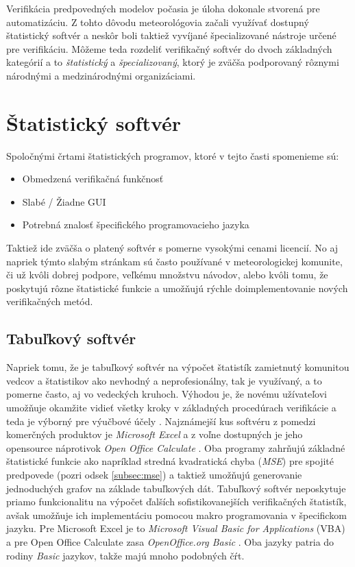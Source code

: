 
Verifikácia predpovedných modelov počasia je úloha dokonale stvorená pre automatizáciu. 
Z tohto dôvodu meteorológovia začali využívať dostupný štatistický softvér 
a neskôr boli taktiež vyvíjané špecializované nástroje určené pre verifikáciu.
Môžeme teda rozdeliť verifikačný softvér do dvoch základných kategórií a to \textit{štatistický} a \textit{špecializovaný}, ktorý je zväčša podporovaný rôznymi národnými a medzinárodnými organizáciami.

\section{Štatistický softvér}

Spoločnými črtami štatistických programov, ktoré v tejto časti spomenieme sú: 
\begin{singlespacing}
\begin{itemize} 
	\item Obmedzená verifikačná funkčnosť
	\item Slabé / Žiadne GUI
	\item Potrebná znalosť špecifického programovacieho jazyka
\end{itemize}
\end{singlespacing}
Taktiež ide zväčša o platený softvér s pomerne vysokými cenami licencií. No aj napriek týmto slabým stránkam sú často používané v meteorologickej komunite, či už kvôli dobrej podpore, veľkému množstvu návodov, alebo kvôli tomu, že poskytujú rôzne štatistické funkcie a umožňujú rýchle doimplementovanie nových verifikačných metód.


\subsection{Tabuľkový softvér}
Napriek tomu, že je tabuľkový softvér na výpočet štatistík zamietnutý komunitou vedcov a štatistikov ako nevhodný a neprofesionálny, tak je využívaný, a to pomerne často, aj vo vedeckých kruhoch. 
Výhodou je, že novému užívateľovi umožňuje okamžite vidieť všetky kroky v základných procedúrach verifikácie a teda je výborný pre výučbové účely \cite{VerifSoft}. 
Najznámejší kus softvéru z pomedzi komerčných produktov je \textit{Microsoft Excel} \cite{Excel} a z voľne dostupných je jeho opensource náprotivok \textit{Open Office Calculate} \cite{OpenOfficeCalc}. Oba programy zahrňujú základné štatistické funkcie ako napríklad stredná kvadratická chyba (\textit{MSE}) pre spojité predpovede (pozri odsek \ref{subsec:mse}) a taktiež umožňujú generovanie jednoduchých grafov na základe tabuľkových dát. Tabuľkový softvér neposkytuje priamo funkcionalitu na výpočet ďalších sofistikovanejších verifikačných štatistík, avšak umožňuje ich implementáciu pomocou makro programovania v špecifickom jazyku. Pre Microsoft Excel je to \textit{Microsoft Visual Basic for Applications} (VBA) \cite{VBA} a pre Open Office Calculate zasa \textit{OpenOffice.org Basic} \cite{OpenOfficeBasic}. Oba jazyky patria do rodiny \textit{Basic} jazykov, takže majú mnoho podobných čŕt.  


